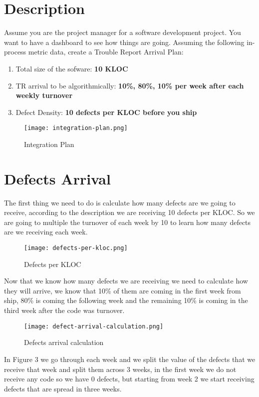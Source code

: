 \section{Description}
Assume you are the project manager for a software development project. 
You want to have a dashboard to see how things are going.\newline\newline
\noindent
Assuming the following in-process metric data, create a Trouble Report 
Arrival Plan:
\begin{enumerate}
    \item Total size of the sofware: \textbf{10 KLOC}
    \item TR arrival to be algorithmically: \textbf{10\%, 80\%, 10\% per week after each weekly turnover}
    \item Defect Density: \textbf{10 defects per KLOC before you ship}
\end{enumerate}

\begin{figure}[!htb]
    \centering
    \texttt{[image: integration-plan.png]}    
    \caption{Integration Plan}
\end{figure}

\pagebreak

\section{Defects Arrival}
The first thing we need to do is calculate how many defects are we going 
to receive, according to the description we are receiving 10 defects 
per KLOC. \newline\newline
\noindent
So we are going to multiple the turnover of each week by 10 to learn how many defects are
we receiving each week.

\begin{figure}[!htb]
    \centering
    \texttt{[image: defects-per-kloc.png]}    
    \caption{Defects per KLOC}
\end{figure}
\noindent
Now that we know how many defects we are receiving we need to calculate how they 
will arrive, we know that 10\% of them are coming in the first week from ship, 
80\% is coming the following week and the remaining 10\% is coming in the third 
week after the code was turnover.

\begin{figure}[!htb]
    \centering
    \texttt{[image: defect-arrival-calculation.png]}    
    \caption{Defects arrival calculation}
\end{figure}
\noindent
In Figure 3 we go through each week and we split the value of the defects 
that we receive that week and split them across 3 weeks, in the first week we do 
not receive any code so we have 0 defects, but starting from week 2 we start 
receiving defects that are spread in three weeks.

